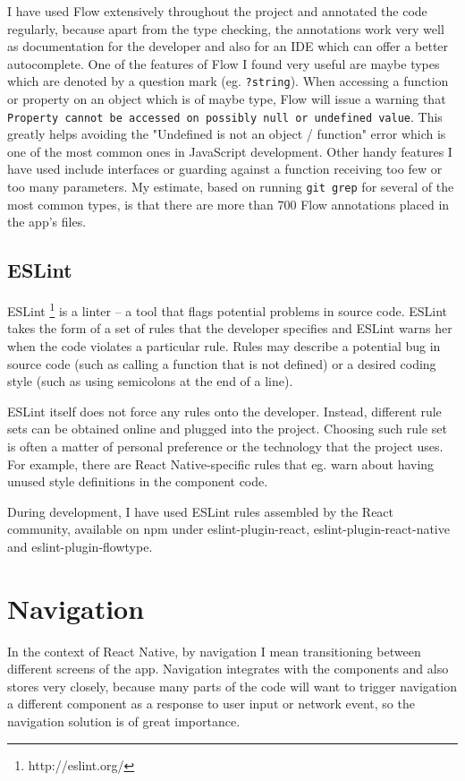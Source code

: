 I have used Flow extensively throughout the project and annotated the code regularly, because apart from the type checking, the annotations work very well as documentation for the developer and also for an IDE which can offer a better autocomplete. One of the features of Flow I found very useful are maybe types which are denoted by a question mark (eg. \texttt{?string}). When accessing a function or property on an object which is of maybe type, Flow will issue a warning that \texttt{Property cannot be accessed on possibly null or undefined value}. This greatly helps avoiding the "Undefined is not an object / function" error which is one of the most common ones in JavaScript development. Other handy features I have used include interfaces or guarding against a function receiving too few or too many parameters. My estimate, based on running \texttt{git grep} for several of the most common types, is that there are more than 700 Flow annotations placed in the app's files.

\subsection{ESLint}

ESLint  \footnote{http://eslint.org/} is a linter -- a tool that flags potential problems in source code. ESLint takes the form of a set of rules that the developer specifies and ESLint warns her when the code violates a particular rule. Rules may describe a potential bug in source code (such as calling a function that is not defined) or a desired coding style (such as using semicolons at the end of a line).

ESLint itself does not force any rules onto the developer. Instead, different rule sets can be obtained online and plugged into the project. Choosing such rule set is often a matter of personal preference or the technology that the project uses. For example, there are React Native-specific rules that eg. warn about having unused style definitions in the component code. 

During development, I have used ESLint rules assembled by the React community, available on npm under eslint-plugin-react, eslint-plugin-react-native and eslint-plugin-flowtype.


\section{Navigation}

In the context of React Native, by navigation I mean transitioning between different screens of the app. Navigation integrates with the components and also stores very closely, because many parts of the code will want to trigger navigation a different component as a response to user input or network event, so the navigation solution is of great importance. 

